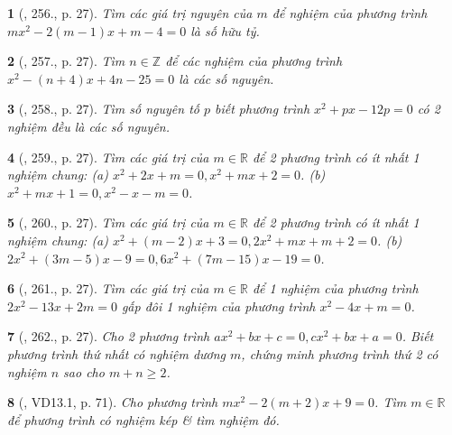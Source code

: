 \documentclass{article}
\newtheorem{baitoan}{}
\begin{document}
\begin{baitoan}[\cite{Binh_Toan_9_tap_2}, 256., p. 27]
	Tìm các giá trị nguyên của $m$ để nghiệm của phương trình $mx^2 - 2(m - 1)x + m - 4 = 0$ là số hữu tỷ.
\end{baitoan}

\begin{baitoan}[\cite{Binh_Toan_9_tap_2}, 257., p. 27]
	Tìm $n\in\mathbb{Z}$ để các nghiệm của phương trình $x^2 - (n + 4)x + 4n - 25 = 0$ là các số nguyên.
\end{baitoan}

\begin{baitoan}[\cite{Binh_Toan_9_tap_2}, 258., p. 27]
	Tìm số nguyên tố $p$ biết phương trình $x^2 + px - 12p = 0$ có 2 nghiệm đều là các số nguyên.
\end{baitoan}

\begin{baitoan}[\cite{Binh_Toan_9_tap_2}, 259., p. 27]
	Tìm các giá trị của $m\in\mathbb{R}$ để 2 phương trình có ít nhất 1 nghiệm chung: (a) $x^2 + 2x + m = 0,x^2 + mx + 2 = 0$. (b) $x^2 + mx + 1 = 0,x^2 - x - m = 0$.
\end{baitoan}

\begin{baitoan}[\cite{Binh_Toan_9_tap_2}, 260., p. 27]
	Tìm các giá trị của $m\in\mathbb{R}$ để 2 phương trình có ít nhất 1 nghiệm chung: (a) $x^2 + (m - 2)x + 3 = 0,2x^2 + mx + m + 2 = 0$. (b) $2x^2 + (3m - 5)x - 9 = 0,6x^2 + (7m - 15)x - 19 = 0$.
\end{baitoan}

\begin{baitoan}[\cite{Binh_Toan_9_tap_2}, 261., p. 27]
	Tìm các giá trị của $m\in\mathbb{R}$ để 1 nghiệm của phương trình $2x^2 - 13x + 2m = 0$ gấp đôi 1 nghiệm của phương trình $x^2 - 4x + m = 0$.
\end{baitoan}

\begin{baitoan}[\cite{Binh_Toan_9_tap_2}, 262., p. 27]
	Cho 2 phương trình $ax^2 + bx + c = 0,cx^2 + bx + a = 0$. Biết phương trình thứ nhất có nghiệm dương $m$, chứng minh phương trình thứ 2 có nghiệm $n$ sao cho $m + n\ge2$.
\end{baitoan}

\begin{baitoan}[\cite{TLCT_THCS_Toan_9_dai_so}, VD13.1, p. 71]
	Cho phương trình $mx^2 - 2(m + 2)x + 9 = 0$. Tìm $m\in\mathbb{R}$ để phương trình có nghiệm kép \& tìm nghiệm đó.
\end{baitoan}
\end{document}
